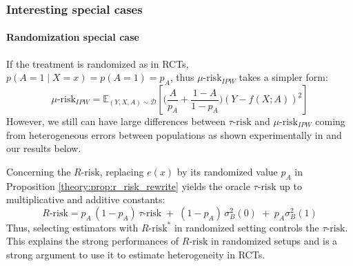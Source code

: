 \documentclass[a4paper,num-refs]{oup-contemporary}%
\begin{document}
\subsubsection{Interesting special cases}\label{apd:theory:special_cases}

\paragraph{Randomization special case}\label{remark:rct} If the treatment is
randomized as in RCTs, $p(A=1 \mid X=x) = p(A=1)=p_A$, thus
$\mu\text{-risk}_{IPW}$ takes a simpler form:
\begin{equation*}
    \mu\text{-risk}_{IPW} = \mathbb{E}_{(Y, X, A) \sim \mathcal D}\left[ \Big( \frac{A}{p_A} + \frac{1-A}{1-p_A} \Big) (Y-f(X ; A))^2 \right]
\end{equation*}
However, we still can have large differences
between $\tau\text{-risk}$ and $\mu\text{-risk}_{IPW}$ coming from heterogeneous
errors between populations as shown experimentally in \cite{schuler_comparison_2018} and our
results below.

Concerning the $R\text{-risk}$, replacing $e(x)$ by its randomized value $p_A$
in Proposition \ref{theory:prop:r_risk_rewrite} yields the oracle
$\tau\text{-risk}$ up to multiplicative and additive constants:
\begin{equation*}
    R\text{-risk} = p_A \, (1-p_A) \, \tau\text{-risk} \;+\; (1 - p_A) \,\sigma_B^2(0) \;+\; p_A \sigma_B^2(1)
\end{equation*}
Thus, selecting estimators with $R\text{-risk}^*$ in
randomized setting controls the $\tau\text{-risk}$. This explains
the strong performances of $R\text{-risk}$ in randomized setups
\cite{schuler_comparison_2018} and is a strong argument to use it
to estimate heterogeneity in RCTs.
\end{document}
